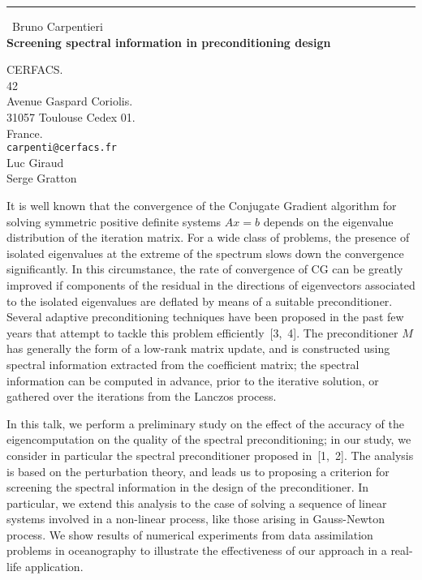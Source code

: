 \documentclass{report}
\begin{document}
\begin{center}
\rule{6in}{1pt} \
{\large Bruno Carpentieri \\
{\bf Screening spectral information in preconditioning design}}

CERFACS. \\ 42 \\ Avenue Gaspard Coriolis.  \\ 31057 Toulouse Cedex 01.  \\ France.
\\
{\tt carpenti@cerfacs.fr}\\
Luc Giraud\\
Serge Gratton\end{center}


It is well known that the convergence of the Conjugate Gradient algorithm for solving
symmetric positive definite systems $Ax=b$ depends on
the eigenvalue distribution of the iteration matrix.
For a wide class of problems,
the presence of isolated eigenvalues at the extreme of the spectrum slows
down the convergence
significantly. In this circumstance, the rate of convergence of CG can be
greatly improved
if components of the
residual in the directions of eigenvectors associated to the isolated eigenvalues
are deflated by means of a suitable preconditioner.
Several adaptive preconditioning techniques have been proposed in the past few years
that attempt to tackle this problem efficiently~[3,~4]. The preconditioner $M$
has generally the form of a low-rank matrix update, and is constructed
using spectral information
extracted from the coefficient matrix;
the spectral information can be computed in advance, prior to the
iterative solution, or gathered over the iterations from the Lanczos process.


In this talk, we perform a preliminary study on the effect of the accuracy
of the eigencomputation on the quality of the spectral preconditioning;
in our study, we consider in particular the spectral preconditioner
proposed in~[1,~2].
The analysis is based on the perturbation theory, and leads us to
proposing a criterion for screening
the spectral information in the design of the preconditioner.
In particular, we extend this analysis to the case
of solving a sequence of linear systems involved in a non-linear process, like those
arising in Gauss-Newton process.
We show results of numerical experiments from data assimilation
problems in oceanography to illustrate the effectiveness of our approach
in a real-life application.
\end{document}
